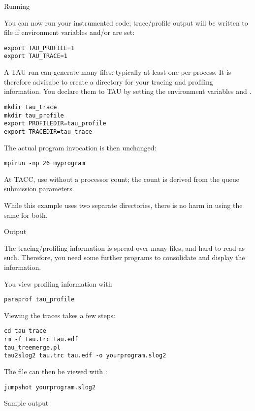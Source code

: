  {Running}

You can now run your instrumented code;
trace/profile output will be written to file 
if environment variables  and/or  are set:
\begin{verbatim}
export TAU_PROFILE=1
export TAU_TRACE=1
\end{verbatim}

A TAU run can generate many files: typically at least one per process.
It is therefore advisabe to create a directory for your tracing and profiling
information. You declare them to TAU by setting the environment variables
 and .
\begin{verbatim}
mkdir tau_trace
mkdir tau_profile
export PROFILEDIR=tau_profile
export TRACEDIR=tau_trace
\end{verbatim}

The actual program invocation is then unchanged:
\begin{verbatim}
mpirun -np 26 myprogram
\end{verbatim}

\begin{tacc}
At TACC, use  without a processor count;
the count is derived from the queue submission parameters.
\end{tacc}

While this example uses two separate directories, there is no
harm in using the same for both.

 {Output}

The tracing/profiling information is spread over many files, and hard to read as such.
Therefore, you need some further programs to consolidate and display the information.

You view profiling information with 
\begin{verbatim}
paraprof tau_profile
\end{verbatim}
Viewing the traces takes a few steps:
\begin{verbatim}
cd tau_trace
rm -f tau.trc tau.edf
tau_treemerge.pl
tau2slog2 tau.trc tau.edf -o yourprogram.slog2 
\end{verbatim}
The  file can then be viewed with :
\begin{verbatim}
jumpshot yourprogram.slog2
\end{verbatim}

 {Sample output}

